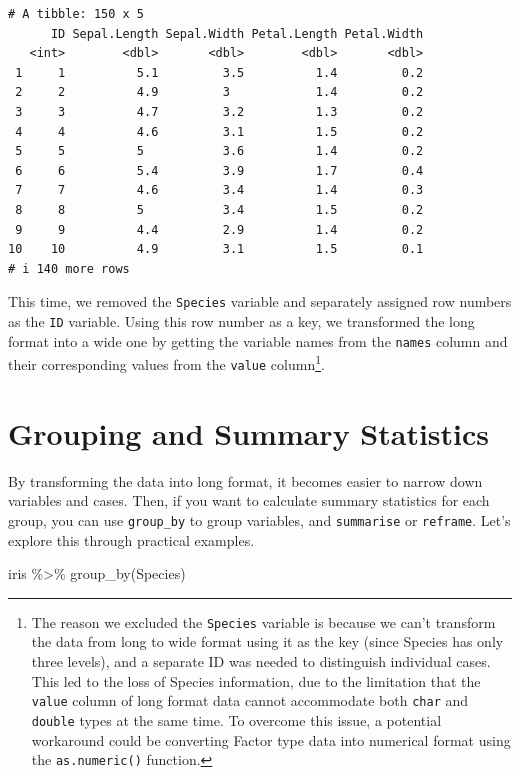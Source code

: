 \documentclass[
  a4paper,
]{book}
\newenvironment{Shaded}{\begin{snugshade}}{\end{snugshade}}
\newcommand{\FunctionTok}[1]{\textcolor[rgb]{0.28,0.35,0.67}{#1}}
\newcommand{\NormalTok}[1]{\textcolor[rgb]{0.00,0.23,0.31}{#1}}
\newcommand{\SpecialCharTok}[1]{\textcolor[rgb]{0.37,0.37,0.37}{#1}}
\begin{document}
\begin{verbatim}
# A tibble: 150 x 5
      ID Sepal.Length Sepal.Width Petal.Length Petal.Width
   <int>        <dbl>       <dbl>        <dbl>       <dbl>
 1     1          5.1         3.5          1.4         0.2
 2     2          4.9         3            1.4         0.2
 3     3          4.7         3.2          1.3         0.2
 4     4          4.6         3.1          1.5         0.2
 5     5          5           3.6          1.4         0.2
 6     6          5.4         3.9          1.7         0.4
 7     7          4.6         3.4          1.4         0.3
 8     8          5           3.4          1.5         0.2
 9     9          4.4         2.9          1.4         0.2
10    10          4.9         3.1          1.5         0.1
# i 140 more rows
\end{verbatim}

This time, we removed the \texttt{Species} variable and separately
assigned row numbers as the \texttt{ID} variable. Using this row number
as a key, we transformed the long format into a wide one by getting the
variable names from the \texttt{names} column and their corresponding
values from the \texttt{value} column\footnote{The reason we excluded
  the \texttt{Species} variable is because we can't transform the data
  from long to wide format using it as the key (since Species has only
  three levels), and a separate ID was needed to distinguish individual
  cases. This led to the loss of Species information, due to the
  limitation that the \texttt{value} column of long format data cannot
  accommodate both \texttt{char} and \texttt{double} types at the same
  time. To overcome this issue, a potential workaround could be
  converting Factor type data into numerical format using the
  \texttt{as.numeric()} function.}.

\section{Grouping and Summary
Statistics}\label{grouping-and-summary-statistics}

By transforming the data into long format, it becomes easier to narrow
down variables and cases. Then, if you want to calculate summary
statistics for each group, you can use \texttt{group\_by} to group
variables, and \texttt{summarise} or \texttt{reframe}. Let's explore
this through practical examples.

\begin{Shaded}
\begin{Highlighting}[]
\NormalTok{iris }\SpecialCharTok{\%\textgreater{}\%} \FunctionTok{group\_by}\NormalTok{(Species)}
\end{Highlighting}
\end{Shaded}
\end{document}
